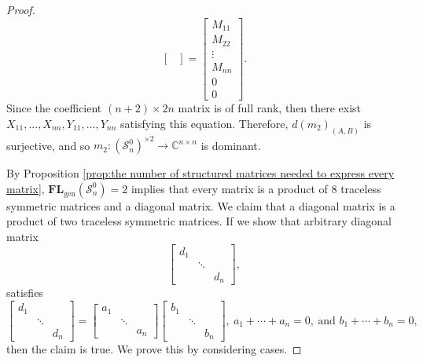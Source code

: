 \documentclass[reqno]{amsart}
\theoremstyle{definition}
\numberwithin{equation}{section}
\begin{document}
\begin{proof}
\begin{equation*}
\begin{bmatrix}
        \end{bmatrix}=\begin{bmatrix}
            M_{11} \\ M_{22} \\ \vdots \\ M_{nn} \\ 0 \\ 0
        \end{bmatrix}.
    \end{equation*}
    Since the coefficient $(n+2) \times 2n$ matrix is of full rank, then there exist $X_{11},...,X_{nn},Y_{11},...,Y_{nn}$ satisfying this equation. Therefore, $d(m_2)_{(A,B)}$ is surjective, and so $m_2:(\mathcal{S}_n^0)^{\times 2} \rightarrow \mathbb{C}^{n \times n}$ is dominant. 
    
    By Proposition \ref{prop:the number of structured matrices needed to express every matrix}, $\mathbf{FL}_{\text{gen}}(\mathcal{S}_n^0)=2$ implies that every matrix is a product of $8$ traceless symmetric matrices and a diagonal matrix. We claim that a diagonal matrix is a product of two traceless symmetric matrices. If we show that arbitrary diagonal matrix
    \begin{equation*}
        \begin{bmatrix}
            d_1 &  &\\
            & \ddots &\\
            & & d_n
        \end{bmatrix},
    \end{equation*}
    satisfies
    \begin{equation*}
        \begin{bmatrix}
            d_1 &  &\\
            & \ddots &\\
            & & d_n
        \end{bmatrix}=\begin{bmatrix}
            a_1 &  &\\
            & \ddots &\\
            & & a_n
        \end{bmatrix}\begin{bmatrix}
            b_1 &  &\\
            & \ddots &\\
            & & b_n
        \end{bmatrix},~a_1+\cdots+a_n=0,~\text{and }b_1+\cdots+b_n=0,
    \end{equation*}
    then the claim is true. We prove this by considering cases.

\end{proof}
\end{document}
